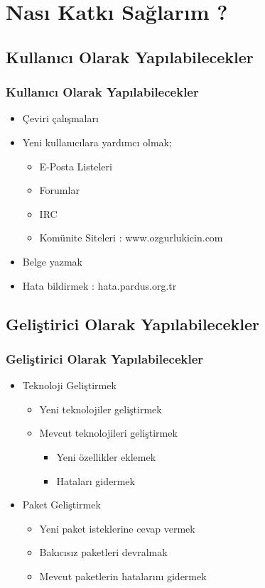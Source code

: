 \documentclass{beamer}
\begin{document}
\section{Nası Katkı Sağlarım ?}

\subsection{Kullanıcı Olarak Yapılabilecekler}
\frame
{
    \frametitle{Kullanıcı Olarak Yapılabilecekler}
	\begin{itemize}
        \item Çeviri çalışmaları
        \item Yeni kullanıcılara yardımcı olmak;
        \begin{itemize}
            \item E-Posta Listeleri
            \item Forumlar
            \item IRC
            \item Komünite Siteleri : www.ozgurlukicin.com
        \end{itemize}
        \item Belge yazmak
        \item Hata bildirmek : hata.pardus.org.tr
	\end{itemize}
}

\subsection{Geliştirici Olarak Yapılabilecekler}
\frame
{
    \frametitle{Geliştirici Olarak Yapılabilecekler}
	\begin{itemize}
        \item Teknoloji Geliştirmek
        \begin{itemize}
            \item Yeni teknolojiler geliştirmek
            \item Mevcut teknolojileri geliştirmek
            \begin{itemize}
                \item Yeni özellikler eklemek
                \item Hataları gidermek
            \end{itemize}
        \end{itemize}
        \item Paket Geliştirmek
        \begin{itemize}
            \item Yeni paket isteklerine cevap vermek
            \item Bakıcısız paketleri devralmak
            \item Mevcut paketlerin hatalarını gidermek
        \end{itemize}
	\end{itemize}
}
\end{document}
